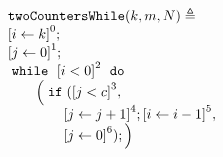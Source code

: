 \begin{example}
  \label{ex:twoCountersWhile}
  \[
  \begin{array}{l}
      \kw{twoCountersWhile}(k, m, N) \triangleq \\
      \clabel{ \assign{i}{k} }^{0} ; \\
      \clabel{ \assign{j}{0} }^{1} ; \\
          \ewhile ~ \clabel{i < 0}^{2} ~ \edo ~ \\
          \qquad \Big(
            \eif(\clabel{j < c}^{3}, \\
            \qquad \qquad \clabel{\assign{j}{j + 1}}^{4}; 
            \clabel{\assign{i}{i - 1}}^{5},\\
            \qquad \qquad \clabel{\assign{j}{0}}^{6});
            \Big)
      \end{array}
  \]
\end{example}

